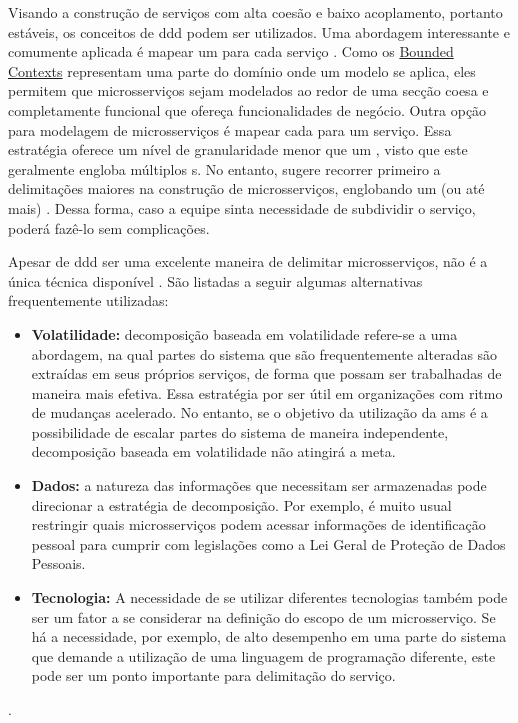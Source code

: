 Visando a construção de serviços com alta coesão e baixo acoplamento, portanto estáveis, os conceitos de \acrshort{ddd} podem ser utilizados. Uma abordagem interessante e comumente aplicada é mapear um  para cada serviço \cite{buildingMicroservices}. Como os \hyperref[section:bounded_context]{Bounded Contexts} representam uma parte do domínio onde um modelo se aplica, eles permitem que microsserviços sejam modelados ao redor de uma secção coesa e completamente funcional que ofereça funcionalidades de negócio. Outra opção para modelagem de microsserviços é mapear cada  para um serviço. Essa estratégia oferece um nível de granularidade menor que um , visto que este geralmente engloba múltiplos s. No entanto,  sugere recorrer primeiro a delimitações maiores na construção de microsserviços, englobando um (ou até mais) . Dessa forma, caso a equipe sinta necessidade de subdividir o serviço, poderá fazê-lo sem complicações.

Apesar de \acrshort{ddd} ser uma excelente maneira de delimitar microsserviços, não é a única técnica disponível \cite{buildingMicroservices}. São listadas a seguir algumas alternativas frequentemente utilizadas:
\begin{itemize}
    \item \textbf{Volatilidade:} decomposição baseada em volatilidade refere-se a uma abordagem, na qual partes do sistema que são frequentemente alteradas são extraídas em seus próprios serviços, de forma que possam ser trabalhadas de maneira mais efetiva. Essa estratégia por ser útil em organizações com ritmo de mudanças acelerado. No entanto, se o objetivo da utilização da \acrshort{ams} é a possibilidade de escalar partes do sistema de maneira independente, decomposição baseada em volatilidade não atingirá a meta.
    \item \textbf{Dados:} a natureza das informações que necessitam ser armazenadas pode direcionar a estratégia de decomposição. Por exemplo, é muito usual restringir quais microsserviços podem acessar informações de identificação pessoal para cumprir com legislações como a Lei Geral de Proteção de Dados Pessoais.
    \item \textbf{Tecnologia:} A necessidade de se utilizar diferentes tecnologias também pode ser um fator a se considerar na definição do escopo de um microsserviço. Se há a necessidade, por exemplo, de alto desempenho em uma parte do sistema que demande a utilização de uma linguagem de programação diferente, este pode ser um ponto importante para delimitação do serviço.
\end{itemize}
\cite{buildingMicroservices}.

